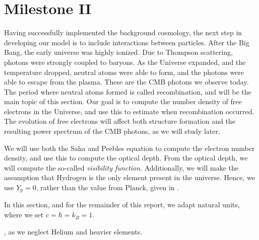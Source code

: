 \section{Milestone II}\label{sec:M2}
Having successfully implemented the background cosmology, the next step in 
developing our model is to include interactions between particles. After the Big Bang, the early universe was highly ionized. Due to Thompson scattering, photons were strongly coupled to baryons. As the Universe expanded, and the temperature dropped, neutral atoms were able to form, and the photons were able to escape from the plasma. These are the CMB photons we observe today. The period where neutral atoms formed is called recombination, and will be the main topic of this section. Our goal is to compute the number density of free electrons in the Universe, and use this to estimate when recombination occurred. The evolution of free electrons will affect both structure formation and the resulting power spectrum of the CMB photons, as we will study later.

We will use both the Saha and Peebles equation to compute the electron number density, and use this to compute the optical depth. From the optical depth, we will compute the so-called \textit{visibility function}. Additionally, we will make the assumption that Hydrogen is the only element present in the universe. Hence, we use $Y_p=0$, rather than the value from Planck, given in . 

In this section, and for the remainder of this report, we adapt natural units, where we set $c=\hbar=k_B=1$. 

, as we neglect Helium and heavier elements. 





 